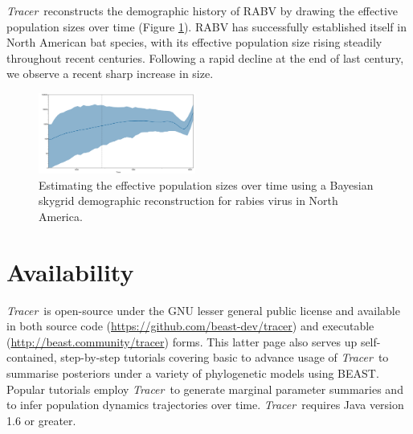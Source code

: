 \documentclass{bioinfo}
\newcommand{\tracer}{\emph{Tracer}}
\begin{document}
\tracer\ reconstructs the demographic history of RABV by drawing the effective population sizes over time (Figure \ref{fig:rabv}).
RABV has successfully established itself in North American bat species, with its effective population size rising steadily throughout recent centuries.
Following a rapid decline at the end of last century, we observe a recent sharp increase in size.

\begin{figure}[t]
\centerline{
\includegraphics[width=0.46\textwidth]{./figures/rabv-skygrid.pdf}
}
\caption{Estimating the effective population sizes over time using a Bayesian skygrid demographic reconstruction for rabies virus in North America.}
\label{fig:rabv}
\end{figure}

\section*{Availability}

\tracer\ is open-source under the GNU lesser general public license and available in both source code (\url{https://github.com/beast-dev/tracer}) and executable (\url{http://beast.community/tracer}) forms.
This latter page also serves up self-contained, step-by-step tutorials covering basic to advance usage of \tracer\ to summarise posteriors under a variety of phylogenetic models using BEAST.
Popular tutorials employ \tracer\ to generate marginal parameter summaries and to infer population dynamics trajectories over time.
\tracer\ requires Java version 1.6 or greater.
\end{document}
